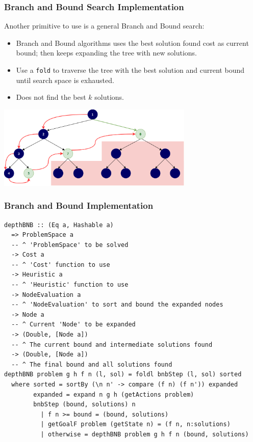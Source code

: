\documentclass{beamer}
\begin{document}
\begin{frame}
  \frametitle{Branch and Bound Search Implementation}
  Another primitive to use is a general Branch and Bound search:
  \begin{itemize}
  \item Branch and Bound algorithms uses the best solution found cost as
    current bound; then keeps expanding the tree with new solutions.
  \item Use a \texttt{fold} to traverse the tree with the best solution and
    current bound until search space is exhausted.
  \item Does not find the best $k$ solutions.
  \end{itemize}
  \centering
  \includegraphics[width=0.7\textwidth]{dfbnb.png}
\end{frame}

\begin{frame}[fragile]
  \frametitle{Branch and Bound Implementation}
\begin{lstlisting}[style=haskell]
depthBNB :: (Eq a, Hashable a)
  => ProblemSpace a
  -- ^ 'ProblemSpace' to be solved
  -> Cost a
  -- ^ 'Cost' function to use
  -> Heuristic a
  -- ^ 'Heuristic' function to use
  -> NodeEvaluation a
  -- ^ 'NodeEvaluation' to sort and bound the expanded nodes
  -> Node a
  -- ^ Current 'Node' to be expanded
  -> (Double, [Node a])
  -- ^ The current bound and intermediate solutions found
  -> (Double, [Node a])
  -- ^ The final bound and all solutions found
depthBNB problem g h f n (l, sol) = foldl bnbStep (l, sol) sorted
  where sorted = sortBy (\n n' -> compare (f n) (f n')) expanded
        expanded = expand n g h (getActions problem)
        bnbStep (bound, solutions) n
          | f n >= bound = (bound, solutions)
          | getGoalF problem (getState n) = (f n, n:solutions)
          | otherwise = depthBNB problem g h f n (bound, solutions)
\end{lstlisting}
\end{frame}
\end{document}
